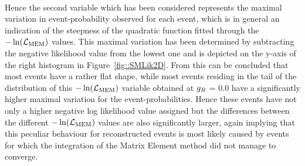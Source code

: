 \\
Hence the second variable which has been considered represents the maximal variation in event-probability observed for each event, which is in general an indication of the steepness of the quadratic function fitted through the $-\ln(\mathcal{L}_{\textrm{MEM}})$ values. This maximal variation has been determined by subtracting the negative likelihood value from the lowest one and is depicted on the y-axis of the right histogram in Figure~\ref{fig::SMLik2D}.
From this can be concluded that most events have a rather flat shape, while most events residing in the tail of the distribution of this $-\ln(\mathcal{L}_{\textrm{MEM}})$ variable obtained at $g_{R}$ = 0.0 have a significantly higher maximal variation for the event-probabilities. Hence these events have not only a higher negative log likelihood value assigned but the differences between the different $-\ln(\mathcal{L}_{\textrm{MEM}})$ values are also significantly larger, again implying that this peculiar behaviour for reconstructed events is most likely caused by events for which the integration of the Matrix Element method did not manage to converge.
\\
